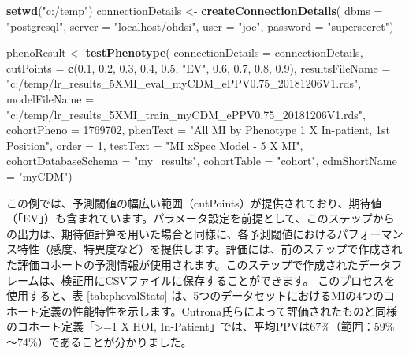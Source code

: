 \documentclass[
  11pt]{book}
\newenvironment{Shaded}{\begin{snugshade}}{\end{snugshade}}
\newcommand{\AttributeTok}[1]{\textcolor[rgb]{0.13,0.29,0.53}{#1}}
\newcommand{\DecValTok}[1]{\textcolor[rgb]{0.00,0.00,0.81}{#1}}
\newcommand{\FloatTok}[1]{\textcolor[rgb]{0.00,0.00,0.81}{#1}}
\newcommand{\FunctionTok}[1]{\textcolor[rgb]{0.13,0.29,0.53}{\textbf{#1}}}
\newcommand{\NormalTok}[1]{#1}
\newcommand{\OtherTok}[1]{\textcolor[rgb]{0.56,0.35,0.01}{#1}}
\newcommand{\StringTok}[1]{\textcolor[rgb]{0.31,0.60,0.02}{#1}}
\theoremstyle{definition}
\theoremstyle{definition}
\theoremstyle{definition}
\theoremstyle{definition}
\theoremstyle{remark}
\begin{document}
\begin{Shaded}
\begin{Highlighting}[]
\FunctionTok{setwd}\NormalTok{(}\StringTok{"c:/temp"}\NormalTok{)}
\NormalTok{connectionDetails }\OtherTok{\textless{}{-}} \FunctionTok{createConnectionDetails}\NormalTok{(}
  \AttributeTok{dbms =} \StringTok{"postgresql"}\NormalTok{,}
  \AttributeTok{server =} \StringTok{"localhost/ohdsi"}\NormalTok{,}
  \AttributeTok{user =} \StringTok{"joe"}\NormalTok{,}
  \AttributeTok{password =} \StringTok{"supersecret"}\NormalTok{)}

\NormalTok{phenoResult }\OtherTok{\textless{}{-}} \FunctionTok{testPhenotype}\NormalTok{(}
  \AttributeTok{connectionDetails =}\NormalTok{ connectionDetails,}
  \AttributeTok{cutPoints =} \FunctionTok{c}\NormalTok{(}\FloatTok{0.1}\NormalTok{, }\FloatTok{0.2}\NormalTok{, }\FloatTok{0.3}\NormalTok{, }\FloatTok{0.4}\NormalTok{, }\FloatTok{0.5}\NormalTok{, }\StringTok{"EV"}\NormalTok{, }\FloatTok{0.6}\NormalTok{, }\FloatTok{0.7}\NormalTok{, }\FloatTok{0.8}\NormalTok{, }\FloatTok{0.9}\NormalTok{),}
  \AttributeTok{resultsFileName =}
    \StringTok{"c:/temp/lr\_results\_5XMI\_eval\_myCDM\_ePPV0.75\_20181206V1.rds"}\NormalTok{,}
  \AttributeTok{modelFileName =}
    \StringTok{"c:/temp/lr\_results\_5XMI\_train\_myCDM\_ePPV0.75\_20181206V1.rds"}\NormalTok{,}
  \AttributeTok{cohortPheno =} \DecValTok{1769702}\NormalTok{,}
  \AttributeTok{phenText =} \StringTok{"All MI by Phenotype 1 X In{-}patient, 1st Position"}\NormalTok{,}
  \AttributeTok{order =} \DecValTok{1}\NormalTok{,}
  \AttributeTok{testText =} \StringTok{"MI xSpec Model {-} 5 X MI"}\NormalTok{,}
  \AttributeTok{cohortDatabaseSchema =} \StringTok{"my\_results"}\NormalTok{,}
  \AttributeTok{cohortTable =} \StringTok{"cohort"}\NormalTok{,}
  \AttributeTok{cdmShortName =} \StringTok{"myCDM"}\NormalTok{)}
\end{Highlighting}
\end{Shaded}

この例では、予測閾値の幅広い範囲（cutPoints）が提供されており、期待値（「EV」）も含まれています。パラメータ設定を前提として、このステップからの出力は、期待値計算を用いた場合と同様に、各予測閾値におけるパフォーマンス特性（感度、特異度など）を提供します。評価には、前のステップで作成された評価コホートの予測情報が使用されます。このステップで作成されたデータフレームは、検証用にCSVファイルに保存することができます。 このプロセスを使用すると、表 \ref{tab:phevalStats} は、5つのデータセットにおけるMIの4つのコホート定義の性能特性を示します。Cutrona氏らによって評価されたものと同様のコホート定義「\textgreater=1 X HOI, In-Patient」では、平均PPVは67\%（範囲：59\%～74\%）であることが分かりました。
\end{document}
